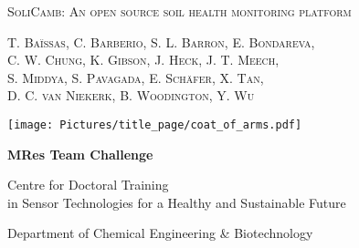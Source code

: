 
	\begin{center}
	
	
	\parbox[t][4cm]{\textwidth}{
		\begin{center}
			\addtolength{\baselineskip}{0.5\baselineskip}
			{\huge\textsc{SoliCamb: An open source soil health monitoring platform}} %
			
			\vspace{2em}
			
			{\Large \textsc{T. Ba{\"i}ssas, C. Barberio, S. L. Barron, E. Bondareva, \\ C. W. Chung, K. Gibson, J. Heck, J. T. Meech, \\S. Middya, S. Pavagada, E. Sch{\"a}fer,  X. Tan, \\ D. C. van Niekerk, B. Woodington, Y. Wu}} %

			\vspace{10em}
			
						
		\end{center}
	}


	\vspace{5em}%
	
	\texttt{[image: Pictures/title\_page/coat\_of\_arms.pdf]}
	
	\vspace{8em}
	
	\parbox[t]{\textwidth}{
		
		\begin{center}
			
			{\Large\bfseries MRes Team Challenge} %
			
			\vspace{1em}
			
			{\Large Centre for Doctoral Training \\ 
				\vspace*{5pt} in Sensor Technologies for a Healthy and Sustainable Future} %
			
			\vspace{1em}
			
			{\Large Department of Chemical Engineering \& Biotechnology} %
			

\end{center}}
\end{center}
